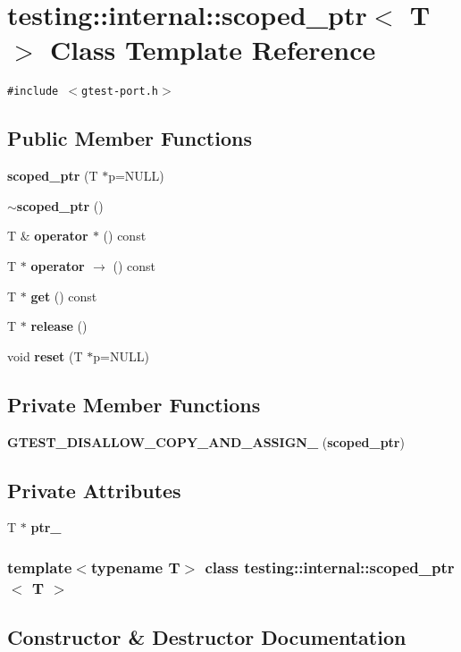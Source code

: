 \section{testing::internal::scoped\_\-ptr$<$ T $>$ Class Template Reference}
\label{classtesting_1_1internal_1_1scoped__ptr}
{\tt \#include $<$gtest-port.h$>$}

\subsection*{Public Member Functions}
\begin{CompactItemize}
\item 
{\bf scoped\_\-ptr} (T $\ast$p=NULL)
\item 
{\bf $\sim$scoped\_\-ptr} ()
\item 
T \& {\bf operator $\ast$} () const
\item 
T $\ast$ {\bf operator $\rightarrow$ } () const
\item 
T $\ast$ {\bf get} () const
\item 
T $\ast$ {\bf release} ()
\item 
void {\bf reset} (T $\ast$p=NULL)
\end{CompactItemize}
\subsection*{Private Member Functions}
\begin{CompactItemize}
\item 
{\bf GTEST\_\-DISALLOW\_\-COPY\_\-AND\_\-ASSIGN\_\-} ({\bf scoped\_\-ptr})
\end{CompactItemize}
\subsection*{Private Attributes}
\begin{CompactItemize}
\item 
T $\ast$ {\bf ptr\_\-}
\end{CompactItemize}
\subsubsection*{template$<$typename T$>$ class testing::internal::scoped\_\-ptr$<$ T $>$}



\subsection{Constructor \& Destructor Documentation}

